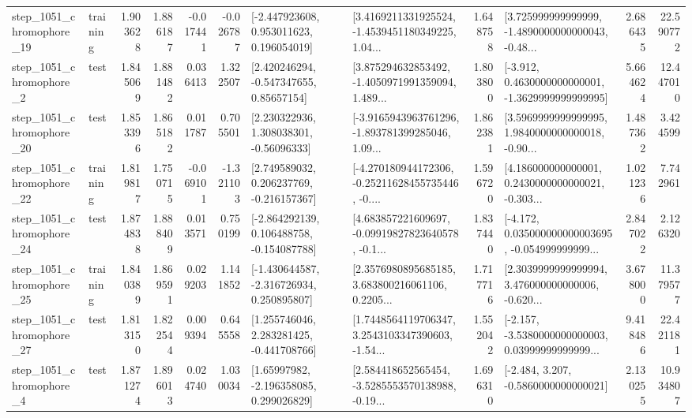 \begin{tabular}{llrrrrllrlrr}
 step\_1051\_chromophore\_19 &  training &      1.903628 &    1.886187 &     -0.017441 & -0.026787 &    [-2.447923608, 0.953011623, 0.196054019] &  [3.4169211331925524, -1.4539451180349225, 1.04... &       1.648758 &  [3.725999999999999, -1.4890000000000043, -0.48... &            2.686435 &         22.590772 \\
  step\_1051\_chromophore\_2 &      test &      1.845069 &    1.881482 &      0.036413 &  1.322507 &     [2.420246294, -0.547347655, 0.85657154] &  [3.875294632853492, -1.4050971991359094, 1.489... &       1.803800 &  [-3.912, 0.4630000000000001, -1.3629999999999995] &            5.664624 &         12.447010 \\
 step\_1051\_chromophore\_20 &      test &      1.853396 &    1.865182 &      0.011787 &  0.705501 &     [2.230322936, 1.308038301, -0.56096333] &  [-3.9165943963761296, -1.893781399285046, 1.09... &       1.862381 &  [3.5969999999999995, 1.9840000000000018, -0.90... &            1.487362 &          3.424599 \\
 step\_1051\_chromophore\_22 &  training &      1.819817 &    1.750715 &     -0.069101 & -1.321103 &    [2.749589032, 0.206237769, -0.216157367] &  [-4.270180944172306, -0.25211628455735446, -0.... &       1.596720 &  [4.186000000000001, 0.2430000000000021, -0.303... &            1.021236 &          7.742961 \\
 step\_1051\_chromophore\_24 &      test &      1.874838 &    1.888409 &      0.013571 &  0.750199 &   [-2.864292139, 0.106488758, -0.154087788] &  [4.683857221609697, -0.09919827823640578, -0.1... &       1.837440 &  [-4.172, 0.035000000000003695, -0.054999999999... &            2.847022 &          2.126320 \\
 step\_1051\_chromophore\_25 &  training &      1.840389 &    1.869591 &      0.029203 &  1.141852 &   [-1.430644587, -2.316726934, 0.250895807] &  [2.3576980895685185, 3.683800216061106, 0.2205... &       1.717716 &  [2.3039999999999994, 3.476000000000006, -0.620... &            3.678000 &         11.379577 \\
 step\_1051\_chromophore\_27 &      test &      1.813150 &    1.822544 &      0.009394 &  0.645558 &    [1.255746046, 2.283281425, -0.441708766] &  [1.7448564119706347, 3.2543103347390603, -1.54... &       1.552042 &  [-2.157, -3.5380000000000003, 0.03999999999999... &            9.418486 &         22.421181 \\
  step\_1051\_chromophore\_4 &      test &      1.871274 &    1.896013 &      0.024740 &  1.030034 &     [1.65997982, -2.196358085, 0.299026829] &  [2.584418652565454, -3.5285553570138988, -0.19... &       1.696310 &               [-2.484, 3.207, -0.5860000000000021] &            2.130255 &         10.934807 \\

\end{tabular}
